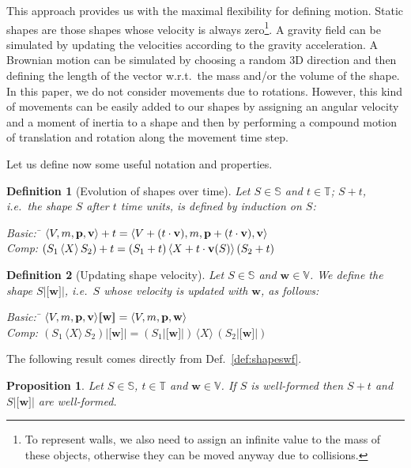 \documentclass[11pt]{article}
\newcommand{\lsbrace}{\ensuremath{|\![}}
\newcommand{\rsbrace}{\ensuremath{]\!|}}
\newcommand{\shapes}{\mathbb{S}}
\newcommand{\vect}[1]{\mathbf{#1}}
\newcommand{\union}[1]{\ensuremath{\,\langle #1 \rangle\,}}
\newcommand{\vel}{{\mathbb V}}
\newcommand{\bs}[4]{\ensuremath{\langle #1, #2, #3, \mathbf{#4}
\rangle}}
\newcommand{\velocity}[1]{{\bf v}(#1)}
\newcommand{\timedomain}{{\mathbb T}}
\newtheorem{definition}{Definition}
\newtheorem{proposition}{Proposition}
\begin{document}
This approach provides us with the maximal flexibility for defining motion. Static shapes are those shapes whose velocity is always zero\footnote{To represent walls, we also need to assign an infinite value to the mass of these objects, otherwise they can be moved anyway due to collisions.}. A gravity field can be simulated by updating the velocities according to the gravity acceleration. A Brownian motion can be simulated by choosing a random 3D direction and then defining the length of the vector w.r.t.\ the mass and/or the volume of the shape. In this paper, we do not consider movements due to rotations. However, this kind of movements can be easily added to our shapes by assigning an angular velocity and a moment of inertia to a shape and then by performing a compound motion of translation and rotation along the movement time step.

Let us define now some useful notation and properties.

\begin{definition}[Evolution of shapes over time]
\label{def:shapemoving}
Let $S \in \shapes$ and $t \in \timedomain$; $S + t$, i.e.\ the shape $S$ after $t$ time
units, is defined by induction on $S$:
\begin{tabbing}
Basic: \quad \= $\bs{V}{m}{{\bf p}}{v} + t = \bs{V + (t \cdot {\bf v})}{m}{\mathbf{p} + (t \cdot
{\bf v})}{v}$\\
Comp: \> $(S_1 \union{X} S_2) + t = (S_1 + t) \union{X + t\cdot \velocity{S}}(S_2 + t)$
\end{tabbing}
\end{definition}


\begin{definition}[Updating shape velocity]
\label{def:shape-velocity}
Let $S\in \shapes$ and $\vect{w}\in\vel$. We define the shape $S\lsbrace\vect{w}\rsbrace$, i.e.\
$S$ whose velocity is updated with $\vect{w}$, as follows:

\begin{tabbing}
Basic: \quad \= $\bs{V}{m}{{\bf p}}{v} \lsbrace\vect{w}\rsbrace = \bs{V}{m}{{\bf p}}{w}$\\
Comp: \> $(S_1 \union{X} S_2) \lsbrace\vect{w}\rsbrace = (S_1 \lsbrace\vect{w}\rsbrace)
\union{X}(S_2\lsbrace\vect{w}\rsbrace)$
\end{tabbing}
\end{definition}

The following result comes directly from Def.~\ref{def:shapeswf}.

\begin{proposition}
\label{prop:shapes-wellformedness}
Let $S \in \shapes$, $t\in \timedomain$ and $\vect{w}\in\vel$. If $S$ is
well-formed then $S+t$ and $S\lsbrace\vect{w}\rsbrace$ are well-formed.
\end{proposition}
\end{document}
